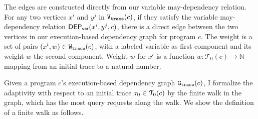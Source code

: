 {
The edges are constructed directly from our variable may-dependency relation. 
For any two vertices $x^{i}$ and $y^{j}$ in $\mathtt{{V_{trace}}}(c)$, if they satisfy the variable may-dependency relation $\mathsf{DEP_{var}}(x^i, y^j, c)$, there is a direct edge between the two vertices in our execution-based dependency graph for program $c$.
} 
The weight is a set of pairs $(x^l, w) \in \mathtt{{W_{trace}}}(c)$,
with a labeled variable as first component and
its weight $w$ the second component.
Weight $w$ for
$x^l$ is a function $w : \mathcal{T}_0(c) \to \mathbb{N}$
mapping from an initial trace to a natural number.

Given 
a program $c$'s execution-based dependency graph 
$\mathtt{{G_{trace}}}({c})$,
I formalize the adaptivity 
with respect to an initial trace $\mathtt{\tau}_0 \in \mathcal{T}_0(c)$ by the finite walk in the graph, which has the most query requests along the walk.
We show the definition of a finite walk as follows.
%


